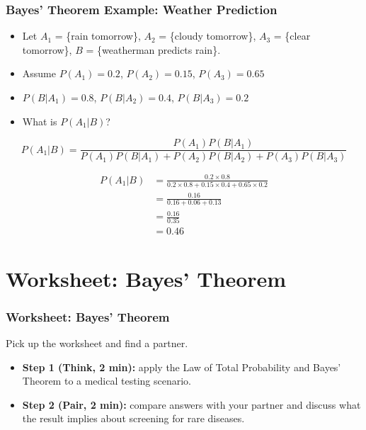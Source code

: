 \documentclass[slidestop,compress,mathserif]{beamer}
\begin{document}
\begin{frame}
\frametitle{Bayes' Theorem Example: Weather Prediction}

\begin{itemize}
	\item Let $A_1$ = \{rain tomorrow\}, $A_2$ = \{cloudy tomorrow\}, $A_3$ = \{clear tomorrow\}, $B$ = \{weatherman predicts rain\}.
	\item Assume $P(A_1) = 0.2$, $P(A_2) = 0.15$, $P(A_3) = 0.65$
	\item $P(B|A_1) = 0.8$, $P(B|A_2) = 0.4$, $P(B|A_3) = 0.2$
	\item What is $P(A_1|B)$?
\end{itemize}

\vspace{2mm}
\pause
\[
P(A_1|B) = \frac{P(A_1)P(B|A_1)}{P(A_1)P(B|A_1) + P(A_2)P(B|A_2) + P(A_3)P(B|A_3)}
\]

\begin{align*}
P(A_1|B) &= \frac{0.2 \times 0.8}{0.2 \times 0.8 + 0.15 \times 0.4 + 0.65 \times 0.2} \\
				&= \frac{0.16}{0.16 + 0.06 + 0.13} \\
				&= \frac{0.16}{0.35} \\
				&= 0.46
\end{align*}
\end{frame}


\section{Worksheet: Bayes' Theorem}

\begin{frame}
\frametitle{Worksheet: Bayes' Theorem}

Pick up the worksheet and find a partner.

\begin{itemize}
    \item \textbf{Step 1 (Think, 2 min):} apply the Law of Total Probability and Bayes' Theorem to a medical testing scenario.
    \item \textbf{Step 2 (Pair, 2 min):} compare answers with your partner and discuss what the result implies about screening for rare diseases.
\end{itemize}

\end{frame}


\end{document}
